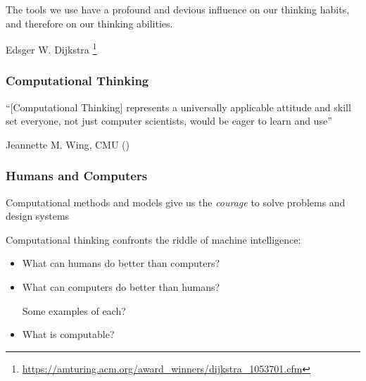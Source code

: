 \documentclass[xcolor=x11names,handout]{beamer}
\begin{document}
\begin{frame}
\frametitle{}
The tools we use have a profound and devious influence on our thinking habits, 
and therefore on our thinking abilities.
\begin{flushright}
Edsger W. Dijkstra%
\footnote{\url{https://amturing.acm.org/award_winners/dijkstra_1053701.cfm}}
\end{flushright}
\end{frame}



\begin{frame}
\frametitle{Computational Thinking}
``[Computational Thinking] represents a universally applicable attitude and
skill set \alert{everyone}, not just computer scientists, would be eager to
learn and use''
\begin{flushright}
	Jeannette M. Wing, CMU (\citeyear{Wing2006})
\end{flushright}
\end{frame}


\begin{frame}
\frametitle{Humans and Computers}

Computational methods and models give us the \textit{courage} to solve problems 
and design systems
\bigskip 			\pause

Computational thinking confronts the riddle of machine intelligence:
\begin{itemize}
 \item What can humans do better than computers?

\item What can computers do better than humans?
\bigskip											\pause

\alert{Some examples of each?}
\bigskip 											\pause

\item What is computable?
\end{itemize}
\end{frame}
\end{document}
